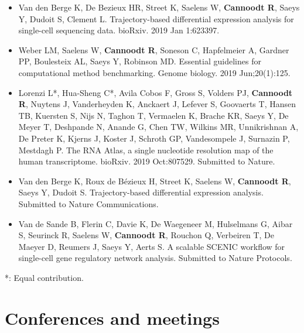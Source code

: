 \begin{itemize}
	\item Van den Berge K, De Bezieux HR, Street K, Saelens W, \textbf{Cannoodt R}, Saeys Y, Dudoit S, Clement L. Trajectory-based differential expression analysis for single-cell sequencing data. bioRxiv. 2019 Jan 1:623397.
	\item Weber LM, Saelens W, \textbf{Cannoodt R}, Soneson C, Hapfelmeier A, Gardner PP, Boulesteix AL, Saeys Y, Robinson MD. Essential guidelines for computational method benchmarking. Genome biology. 2019 Jun;20(1):125.
	\item Lorenzi L*, Hua-Sheng C*, Avila Cobos F, Gross S, Volders PJ, \textbf{Cannoodt R}, Nuytens J, Vanderheyden K, Anckaert J, Lefever S, Goovaerts T, Hansen TB, Kuersten S, Nijs N, Taghon T, Vermaelen K, Brache KR, Saeys Y, De Meyer T, Deshpande N, Anande G, Chen TW, Wilkins MR, Unnikrishnan A, De Preter K, Kjerns J, Koster J, Schroth GP, Vandesompele J, Surnazin P, Mestdagh P. The RNA Atlas, a single nucleotide resolution map of the human transcriptome. bioRxiv. 2019 Oct:807529. Submitted to Nature. 
	\item Van den Berge K, Roux de Bézieux H, Street K, Saelens W, \textbf{Cannoodt R}, Saeys Y, Dudoit S. Trajectory-based differential expression analysis. Submitted to Nature Communications.
	\item Van de Sande B, Flerin C, Davie K, De Waegeneer M, Hulselmans G, Aibar S, Seurinck R, Saelens W, \textbf{Cannoodt R}, Rouchon Q, Verbeiren T, De Maeyer D, Reumers J, Saeys Y, Aerts S. A scalable SCENIC workflow for single-cell gene regulatory network analysis. Submitted to Nature Protocols.
\end{itemize}

*: Equal contribution.

\section{Conferences and meetings}

